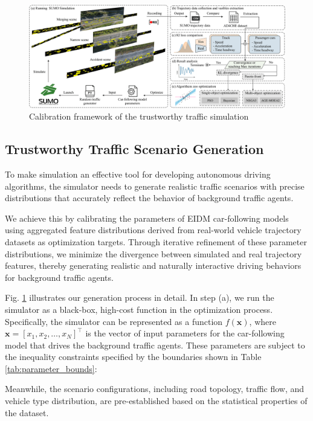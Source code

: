 \begin{figure}[htbp]
    \centering
    \includegraphics[width=\textwidth]{fig/calibration_framework.png}
    \caption{Calibration framework of the trustworthy traffic simulation}
    \label{fig:calibration}
\end{figure}

\subsection{Trustworthy Traffic Scenario Generation}
To make simulation an effective tool for developing autonomous driving algorithms, the simulator needs to generate realistic traffic scenarios with precise distributions that accurately reflect the behavior of background traffic agents.

We achieve this by calibrating the parameters of EIDM \cite{EIDM} car-following models using aggregated feature distributions derived from real-world vehicle trajectory datasets as optimization targets.
Through iterative refinement of these parameter distributions, we minimize the divergence between simulated and real trajectory features, thereby generating realistic and naturally interactive driving behaviors for background traffic agents.

Fig. \ref{fig:calibration} illustrates our generation process in detail. In step (a), we run the simulator as a black-box, high-cost function in the optimization process. Specifically, the simulator can be represented as a function $f(\mathbf{x})$, where $\mathbf{x} = [x_1, x_2, \ldots, x_N]^\top$ is the vector of input parameters for the car-following model that drives the background traffic agents. These parameters are subject to the inequality constraints specified by the boundaries shown in Table \ref{tab:parameter_bounds}:




Meanwhile, the scenario configurations, including road topology, traffic flow, and vehicle type distribution, are pre-established based on the statistical properties of the dataset.

